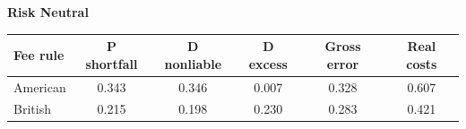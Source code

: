 \documentclass[10pt,border=5pt,varwidth=17cm]{standalone}
\begin{document}
\begingroup
\small
\setlength{\tabcolsep}{5pt}
\renewcommand{\arraystretch}{1.20}
\noindent\textbf{Risk Neutral}\par\smallskip
\noindent\begin{tabularx}{\linewidth}{@{}>{\raggedright\arraybackslash}Xccccc@{}}
\toprule
\textbf{Fee rule} & \textbf{P shortfall} & \textbf{D nonliable} & \textbf{D excess} & \textbf{Gross error} & \textbf{Real costs} \\
\midrule
American & 0.343 & 0.346 & 0.007 & 0.328 & 0.607 \\
British & 0.215 & 0.198 & 0.230 & 0.283 & 0.421 \\
\bottomrule\end{tabularx}\par\medskip
\endgroup
\end{document}
